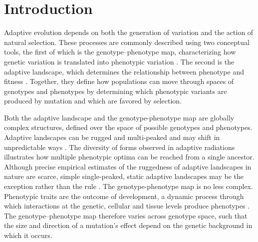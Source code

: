 \section{Introduction} \label{intro}

Adaptive evolution depends on both the generation of variation and the action of natural selection.
These processes are commonly described using two conceptual tools, the first of which is the genotype–phenotype map, characterizing how genetic variation is translated into phenotypic variation \parencite{houle2010phenomics}.
The second is the adaptive landscape, which determines the relationship between phenotype and fitness \parencite{arnold2001adaptive, steppan2002comparative, Schluter2024-wd}.
Together, they define how populations can move through spaces of genotypes and phenotypes by determining which phenotypic variants are produced by mutation and which are favored by selection.

Both the adaptive landscape and the genotype-phenotype map are globally complex structures, defined over the space of possible genotypes and phenotypes.
Adaptive landscapes can be rugged and multi-peaked \parencite{Martin2013-ez, Martin2020-kn} and may shift in unpredictable ways \parencite{Stroud2023-nn}.
The diversity of forms observed in adaptive radiations illustrates how multiple phenotypic optima can be reached from a single ancestor.
Although precise empirical estimates of the ruggedness of adaptive landscapes in nature are scarce, simple single-peaked, static adaptive landscapes may be the exception rather than the rule \parencite{Uyeda2024-ds}.
The genotype-phenotype map is no less complex.
Phenotypic traits are the outcome of development, a dynamic process through which interactions at the genetic, cellular and tissue levels produce phenotypes \parencite{alberch1991genes, houle2010phenomics, milocco2022evolution}.
The genotype–phenotype map therefore varies across genotype space, such that the size and direction of a mutation's effect depend on the genetic background in which it occurs.


